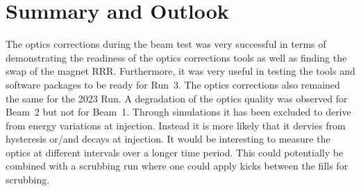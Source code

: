 \documentclass[a4paper]{cernatsnote}
\begin{document}
\section{Summary and Outlook}
The optics corrections during the beam test was very successful in terms of demonstrating the readiness of the optics corrections tools as well as finding the swap of the magnet RRR. Furthermore, it was very useful in testing the tools and software packages to be ready for Run~3. The optics corrections also remained the same for the 2023 Run. A degradation of the optics quality was observed for Beam~2 but not for Beam~1. Through simulations it has been excluded to derive from energy variations at injection. Instead it is more likely that it dervies from hysteresis or/and decays at injection. It would be interesting to measure the optics at different intervals over a longer time period. This could potentially be combined with a scrubbing run where one could apply kicks between the fills for scrubbing. 
\end{document}
